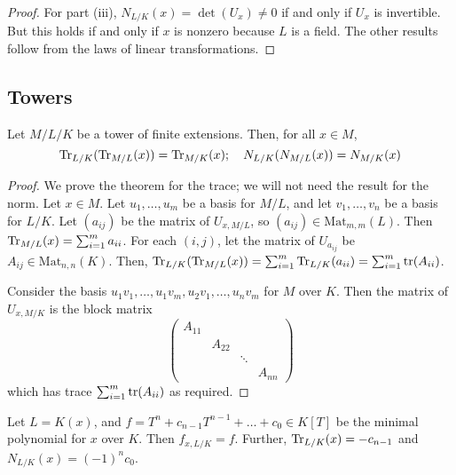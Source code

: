 \begin{proof}
	For part (iii), \( N_{L/K}(x) = \det(U_x) \neq 0 \) if and only if \( U_x \) is invertible.
	But this holds if and only if \( x \) is nonzero because \( L \) is a field.
	The other results follow from the laws of linear transformations.
\end{proof}

\subsection{Towers}
\begin{theorem}
	Let \( M / L / K \) be a tower of finite extensions.
	Then, for all \( x \in M \),
	\[ \Tr_{L/K}(\Tr_{M/L}(x)) = \Tr_{M/K}(x);\quad N_{L/K}(N_{M/L}(x)) = N_{M/K}(x) \]
\end{theorem}
\begin{proof}
	We prove the theorem for the trace; we will not need the result for the norm.
	Let \( x \in M \).
	Let \( u_1, \dots, u_m \) be a basis for \( M / L \), and let \( v_1, \dots, v_n \) be a basis for \( L / K \).
	Let \( (a_{ij}) \) be the matrix of \( U_{x,M/L} \), so \( (a_{ij}) \in \mathrm{Mat}_{m,m}(L) \).
	Then \( \Tr_{M/L}(x) = \sum_{i=1}^m a_{ii} \).
	For each \( (i, j) \), let the matrix of \( U_{a_{ij}} \) be \( A_{ij} \in \mathrm{Mat}_{n,n}(K) \).
	Then, \( \Tr_{L/K}(\Tr_{M/L}(x)) = \sum_{i=1}^m \Tr_{L/K}(a_{ii}) = \sum_{i=1}^m \tr(A_{ii}) \).

	Consider the basis \( u_1v_1, \dots, u_1v_m, u_2v_1, \dots, u_nv_m \) for \( M \) over \( K \).
	Then the matrix of \( U_{x,M/K} \) is the block matrix
	\[ \begin{pmatrix}
		A_{11} \\
		& A_{22} \\
		& & \ddots \\
		& & & A_{nn}
	\end{pmatrix} \]
	which has trace \( \sum_{i=1}^m \tr(A_{ii}) \) as required.
\end{proof}
\begin{proposition}
	Let \( L = K(x) \), and \( f = T^n + c_{n-1} T^{n-1} + \dots + c_0 \in K[T] \) be the minimal polynomial for \( x \) over \( K \).
	Then \( f_{x,L/K} = f \).
	Further, \( \Tr_{L/K}(x) = -c_{n-1} \) and \( N_{L/K}(x) = (-1)^n c_0 \).
\end{proposition}
